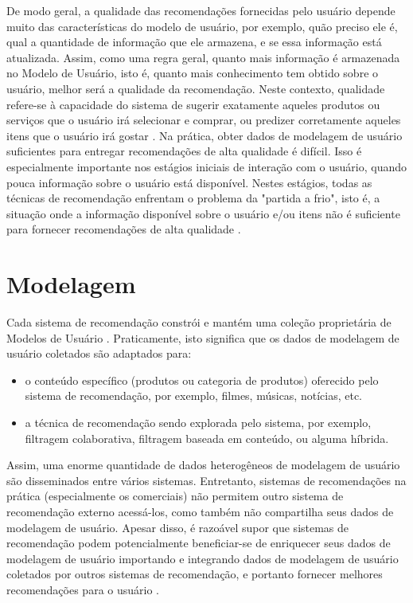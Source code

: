 De modo geral, a qualidade das recomendações fornecidas pelo usuário depende muito das características do modelo de usuário, por exemplo, quão preciso ele é, qual a quantidade de informação que ele armazena, e se essa informação está atualizada. Assim, como uma regra geral, quanto mais informação é armazenada no Modelo de Usuário, isto é, quanto mais conhecimento tem obtido sobre o usuário, melhor será a qualidade da recomendação. Neste contexto, qualidade refere-se à capacidade do sistema de sugerir exatamente aqueles produtos ou serviços que o usuário irá selecionar e comprar, ou predizer corretamente aqueles itens que o usuário irá gostar \citep{Berkovsky:2008:MUM:1380736.1380749}. Na prática, obter dados de modelagem de usuário suficientes para entregar recomendações de alta qualidade é difícil. Isso é especialmente importante nos estágios iniciais de interação com o usuário, quando pouca informação sobre o usuário está disponível. Nestes estágios, todas as técnicas de recomendação enfrentam o problema da "partida a frio", isto é, a situação onde a informação disponível sobre o usuário e/ou itens não é suficiente para fornecer recomendações de alta qualidade \citep{Linden:2003:ARI:642462.642471}.


\section{Modelagem}

Cada sistema de recomendação constrói e mantém uma coleção proprietária de Modelos de Usuário \citep{Montaner:2003:TRA:640471.640491}. Praticamente, isto significa que os dados de modelagem de usuário coletados são adaptados para:

\begin{itemize}
	\item{o conteúdo específico (produtos ou categoria de produtos) oferecido pelo sistema de recomendação, por exemplo, filmes, músicas, notícias, etc.}
	
	\item{a técnica de recomendação sendo explorada pelo sistema, por exemplo, filtragem colaborativa, filtragem baseada em conteúdo, ou alguma híbrida.}
\end{itemize}

Assim, uma enorme quantidade de dados heterogêneos de modelagem de usuário são disseminados entre vários sistemas. Entretanto, sistemas de recomendações na prática (especialmente os comerciais) não permitem outro sistema de recomendação externo acessá-los, como também não compartilha seus dados de modelagem de usuário. Apesar disso, é razoável supor que sistemas de recomendação podem potencialmente beneficiar-se de enriquecer seus dados de modelagem de usuário importando e integrando dados de modelagem de usuário coletados por outros sistemas de recomendação, e portanto fornecer melhores recomendações para o usuário \citep{Berkovsky:2008:MUM:1380736.1380749}.

